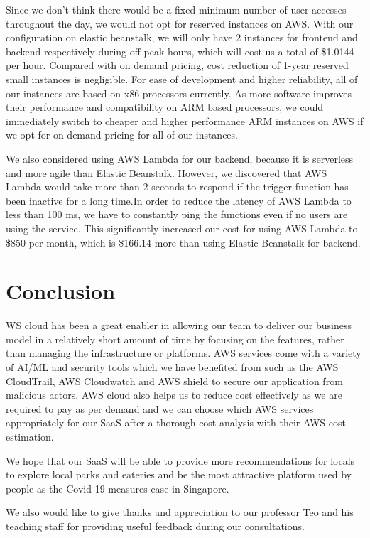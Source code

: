 \documentclass[12pt,a4paper]{article}
\begin{document}
Since we don’t think there would be a fixed minimum number of user accesses throughout the day, we would not opt for reserved instances on AWS. With our configuration on elastic beanstalk, we will only have 2 instances for frontend and backend respectively during off-peak hours, which will cost us a total of \$1.0144 per hour. Compared with on demand pricing, cost reduction of 1-year reserved small instances is negligible. For ease of development and higher reliability, all of our instances are based on x86 processors currently. As more software improves their performance and compatibility on ARM based processors, we could immediately switch to cheaper and higher performance ARM instances on AWS if we opt for on demand pricing for all of our instances.

We also considered using AWS Lambda for our backend, because it is serverless and more agile than Elastic Beanstalk. However, we discovered that AWS Lambda would take more than 2 seconds to respond if the trigger function has been inactive for a long time.In order to reduce the latency of AWS Lambda to less than 100 ms, we have to constantly ping the functions even if no users are using the service. This significantly increased our cost for using AWS Lambda to \$850 per month, which is \$166.14 more than using Elastic Beanstalk for backend. 

\section{Conclusion}

WS cloud has been a great enabler in allowing our team to deliver our business model in a relatively short amount of time by focusing on the features, rather than managing the infrastructure or platforms. AWS services come with a variety of AI/ML and security tools which we have benefited from such as the AWS CloudTrail, AWS Cloudwatch and AWS shield to secure our application from malicious actors. AWS cloud also helps us to reduce cost effectively as we are required to pay as per demand and we can choose which AWS services appropriately for our SaaS after a thorough cost analysis with their AWS cost estimation. 

We hope that our SaaS will be able to provide more recommendations for locals to explore local parks and eateries and be the most attractive platform used by people as the Covid-19 measures ease in Singapore. 

We also would like to give thanks and appreciation to our professor Teo and his teaching staff for providing useful feedback during our consultations.
\end{document}
